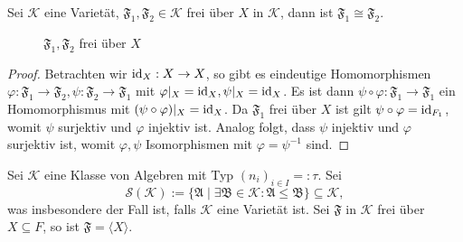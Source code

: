 \begin{proposition}
    Sei $\mathcal{K}$ eine Varietät, $\mathfrak{F}_1, \mathfrak{F}_2 \in \mathcal{K}$ frei über $X$ in $\mathcal{K}$, dann ist $\mathfrak{F}_1 \cong \mathfrak{F}_2$.
\end{proposition}

\begin{figure}[H]
    \centering
    \caption{$\mathfrak{F}_1, \mathfrak{F}_2$ frei über $X$}
\end{figure}

\begin{proof}
    Betrachten wir $\operatorname{id}_X : X \to X$, so gibt es eindeutige Homomorphismen $\varphi : \mathfrak{F}_1 \to \mathfrak{F}_2, \psi : \mathfrak{F}_2 \to \mathfrak{F}_1$ mit $\varphi \vert_X = \operatorname{id}_X, \psi \vert_X = \operatorname{id}_X$. Es ist dann $\psi \circ \varphi : \mathfrak{F}_1 \to \mathfrak{F}_1$ ein Homomorphismus mit $(\psi \circ \varphi) \vert_X = \operatorname{id}_X$. Da $\mathfrak{F}_1$ frei über $X$ ist gilt $\psi \circ \varphi = \operatorname{id}_{F_1}$, womit $\psi$ surjektiv und $\varphi$ injektiv ist. Analog folgt, dass $\psi$ injektiv und $\varphi$ surjektiv ist, womit $\varphi, \psi$ Isomorphismen mit $\varphi = \psi^{-1}$ sind.
\end{proof}


\begin{proposition}
    Sei $\mathcal{K}$ eine Klasse von Algebren mit Typ $(n_i)_{i \in I} =: \tau$. Sei
    $$ \mathcal{S}(\mathcal{K}) := \{ \mathfrak{A} \mid \exists \mathfrak{B} \in \mathcal{K}: \mathfrak{A} \leq \mathfrak{B} \} \subseteq \mathcal{K}, $$
    was insbesondere der Fall ist, falls $\mathcal{K}$ eine Varietät ist. Sei $\mathfrak{F}$ in $\mathcal{K}$ frei über $X \subseteq F$, so ist $\mathfrak{F} = \langle X \rangle$.
\end{proposition}

